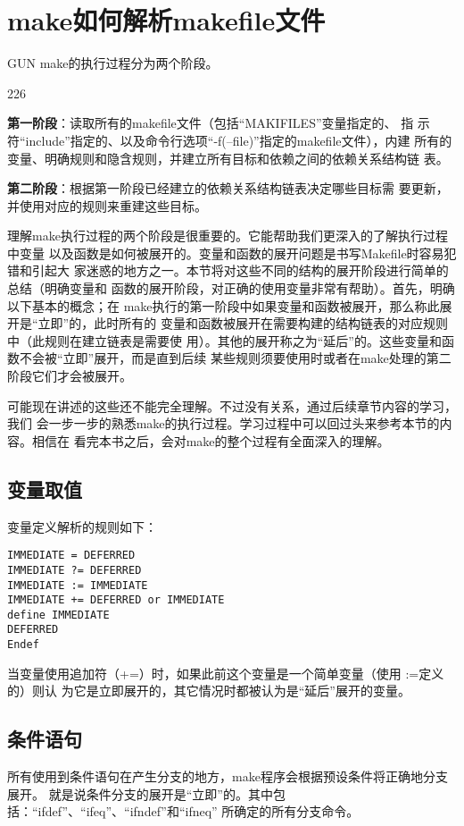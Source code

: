\section{make如何解析makefile文件}
GUN make的执行过程分为两个阶段。

\begin{dinglist}{226}
\itemsep=4pt \parskip=0pt

\item \textbf{第一阶段}：读取所有的makefile文件（包括“MAKIFILES”变量指定的、
    指
    示符“include”指定的、以及命令行选项“-f(--file)”指定的makefile文件），内建
    所有的变量、明确规则和隐含规则，并建立所有目标和依赖之间的依赖关系结构链
    表。

\item \textbf{第二阶段}：根据第一阶段已经建立的依赖关系结构链表决定哪些目标需
    要更新，并使用对应的规则来重建这些目标。
\end{dinglist}

理解make执行过程的两个阶段是很重要的。它能帮助我们更深入的了解执行过程中变量
以及函数是如何被展开的。变量和函数的展开问题是书写Makefile时容易犯错和引起大
家迷惑的地方之一。本节将对这些不同的结构的展开阶段进行简单的总结（明确变量和
函数的展开阶段，对正确的使用变量非常有帮助）。首先，明确以下基本的概念；在
make执行的第一阶段中如果变量和函数被展开，那么称此展开是“立即”的，此时所有的
变量和函数被展开在需要构建的结构链表的对应规则中（此规则在建立链表是需要使
用）。其他的展开称之为“延后”的。这些变量和函数不会被“立即”展开，而是直到后续
某些规则须要使用时或者在make处理的第二阶段它们才会被展开。

可能现在讲述的这些还不能完全理解。不过没有关系，通过后续章节内容的学习，我们
会一步一步的熟悉make的执行过程。学习过程中可以回过头来参考本节的内容。相信在
看完本书之后，会对make的整个过程有全面深入的理解。

\subsection{变量取值}变量定义解析的规则如下：
\begin{Verbatim}[]
IMMEDIATE = DEFERRED
IMMEDIATE ?= DEFERRED
IMMEDIATE := IMMEDIATE
IMMEDIATE += DEFERRED or IMMEDIATE
define IMMEDIATE
DEFERRED
Endef
\end{Verbatim}
当变量使用追加符（+=）时，如果此前这个变量是一个简单变量（使用 :=定义的）则认
为它是立即展开的，其它情况时都被认为是“延后”展开的变量。


\subsection{条件语句}
所有使用到条件语句在产生分支的地方，make程序会根据预设条件将正确地分支展开。
就是说条件分支的展开是“立即”的。其中包括：“ifdef”、“ifeq”、“ifndef”和“ifneq”
所确定的所有分支命令。


